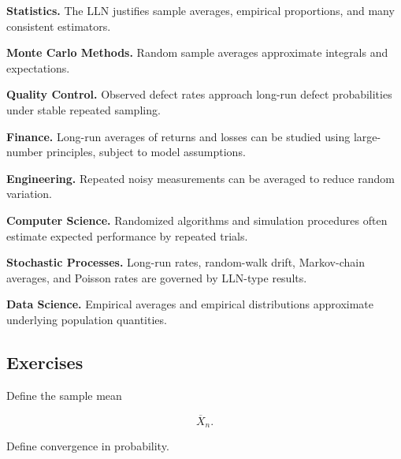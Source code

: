 \begin{applicationbox}

\textbf{Statistics.}
The LLN justifies sample averages, empirical proportions, and many
consistent estimators.

\medskip

\textbf{Monte Carlo Methods.}
Random sample averages approximate integrals and expectations.

\medskip

\textbf{Quality Control.}
Observed defect rates approach long-run defect probabilities under
stable repeated sampling.

\medskip

\textbf{Finance.}
Long-run averages of returns and losses can be studied using
large-number principles, subject to model assumptions.

\medskip

\textbf{Engineering.}
Repeated noisy measurements can be averaged to reduce random variation.

\medskip

\textbf{Computer Science.}
Randomized algorithms and simulation procedures often estimate expected
performance by repeated trials.

\medskip

\textbf{Stochastic Processes.}
Long-run rates, random-walk drift, Markov-chain averages, and Poisson
rates are governed by LLN-type results.

\medskip

\textbf{Data Science.}
Empirical averages and empirical distributions approximate underlying
population quantities.

\end{applicationbox}

\subsection{Exercises}
\label{subsec:lln-exercises}

\begin{exercise}[1]
Define the sample mean

\[
\overline{X}_n.
\]
\end{exercise}

\begin{exercise}[1]
Define convergence in probability.
\end{exercise}

